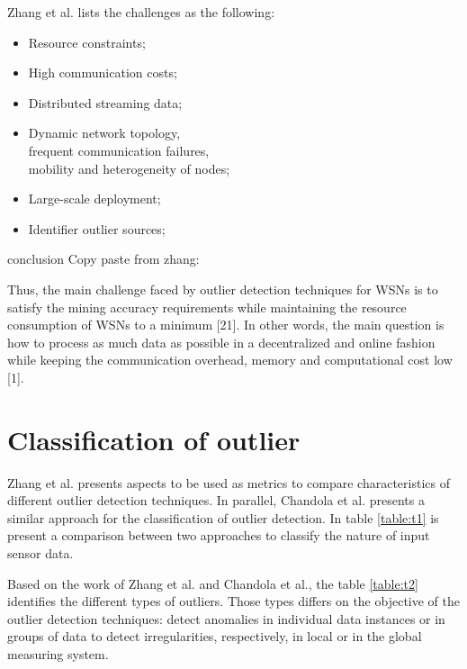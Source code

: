 Zhang et al. \cite{gen:zhang:2010} lists the challenges as the following:

\begin{itemize}
	\setlength\itemsep{-0.5em}
	
	\item Resource constraints;
	
	\item High communication costs;
	
	\item Distributed streaming data;
	
	\item Dynamic network topology, \\ frequent communication failures, \\ mobility and heterogeneity of nodes;
	
	\item Large-scale deployment;
	
	\item Identifier outlier sources;
	
\end{itemize}

\begin{framed}
	conclusion Copy paste from zhang:
	
	Thus, the main challenge faced by outlier detection techniques for WSNs is to satisfy the mining accuracy requirements while maintaining the resource consumption of WSNs
	to a minimum [21]. In other words, the main question is how to
	process as much data as possible in a decentralized and online
	fashion while keeping the communication overhead, memory
	and computational cost low [1].
\end{framed}


\section{Classification of outlier}

Zhang et al. \cite{gen:zhang:2010} presents aspects to be used as metrics to compare characteristics of different outlier detection techniques. In parallel, Chandola et al. \cite{gen:chandola:2009} presents a similar approach for the classification of outlier detection. In table \ref{table:t1} is present a comparison between two approaches to classify the nature of input sensor data.

	

	

Based on the work of Zhang et al. and Chandola et al., the table \ref{table:t2} identifies the different types of outliers. 
Those types differs on the objective of the outlier detection techniques: detect anomalies in individual data instances or in groups of data to detect irregularities, respectively, in local or in the global measuring system.

